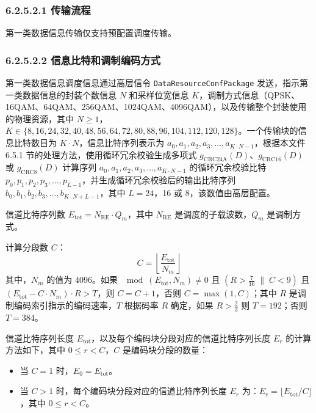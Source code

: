 \documentclass[11pt,a4paper]{ctexart}
\begin{document}
\subsubsection{6.2.5.2.1 传输流程}

第一类数据信息传输仅支持预配置调度传输。

\subsubsection{6.2.5.2.2 信息比特和调制编码方式}

第一类数据信息调度信息通过高层信令 \texttt{DataResourceConfPackage} 发送，指示第一类数据信息的封装个数信息 $N$ 和采样位宽信息 $K$，调制方式信息（QPSK、16QAM、64QAM、256QAM、1024QAM、4096QAM），以及传输整个封装使用的物理资源，其中 $N \geq 1$，$K \in \{8,16,24,32,40,48,56,64,72,80,88,96,104,112,120,128\}$。一个传输块的信息比特数目为 $K \cdot N$，信息比特序列表示为 $a_0, a_1, a_2, a_3, \ldots, a_{K \cdot N - 1}$，根据本文件 6.5.1 节的处理方法，使用循环冗余校验生成多项式 $g_{\mathrm{CRC24A}}(D)$、$g_{\mathrm{CRC16}}(D)$ 或 $g_{\mathrm{CRC8}}(D)$ 计算序列 $a_0, a_1, a_2, a_3, \ldots, a_{K \cdot N - 1}$ 的循环冗余校验比特 $p_0, p_1, p_2, p_3, \ldots, p_{L-1}$，并生成循环冗余校验后的输出比特序列 $b_0, b_1, b_2, b_3, \ldots, b_{K \cdot N + L - 1}$，其中 $L = 24$，16 或 8，该数值由高层配置。

信道比特序列数 $E_{\mathrm{tot}} = N_{\mathrm{RE}} \cdot Q_m$，其中 $N_{\mathrm{RE}}$ 是调度的子载波数，$Q_m$ 是调制方式。

计算分段数 $C$：
\begin{equation}
C = \left\lfloor \frac{E_{\mathrm{tot}}}{N_m} \right\rfloor
\end{equation}
其中，$N_m$ 的值为 4096。如果 $\mod(E_{\mathrm{tot}}, N_m) \neq 0$ 且 $(R > \tfrac{7}{16} \;\|\; C < 9)$ 且 $(E_{\mathrm{tot}} - C \cdot N_m) \cdot R > T$，则 $C = C + 1$，否则 $C = \max(1, C)$；其中 $R$ 是调制编码索引指示的编码速率，$T$ 根据码率 $R$ 确定，如果 $R > \tfrac{2}{3}$ 则 $T = 192$；否则 $T = 384$。

信道比特序列长度 $E_{\mathrm{tot}}$，以及每个编码块分段对应的信道比特序列长度 $E_r$ 的计算方法如下，其中 $0 \leq r < C$，$C$ 是编码块分段的数量：
\begin{itemize}[nosep]
  \item 当 $C = 1$ 时，$E_0 = E_{\mathrm{tot}}$。
  \item 当 $C > 1$ 时，每个编码块分段对应的信道比特序列长度 $E_r$ 为：$E_r = \lfloor E_{\mathrm{tot}} / C \rfloor$，其中 $0 \leq r < C$。
\end{itemize}
\end{document}
